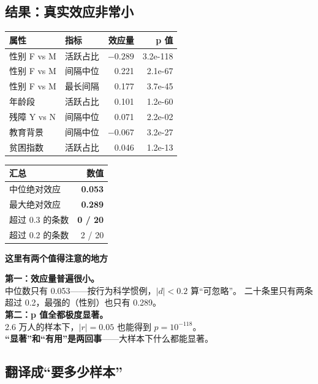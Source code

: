 \documentclass[UTF8,a4paper,11pt]{ctexart}
\newenvironment{explainbox}[1]
{\begin{center}\begin{minipage}{0.94\textwidth}\colorbox{boxbg}{\parbox{0.92\textwidth}{\textbf{#1}\par\vspace{2pt}}}}
{\end{minipage}\end{center}}
\begin{document}
\subsection{结果：真实效应非常小}

\begin{center}
\begin{tabular}{p{4.4cm}p{3.6cm}rr}
\toprule
\textbf{属性} & \textbf{指标} & \textbf{效应量} & \textbf{p 值} \\
\midrule
性别 F vs M & 活跃占比 & \textbf{$-0.289$} & 3.2e-118 \\
性别 F vs M & 间隔中位 & 0.221 & 2.1e-67 \\
性别 F vs M & 最长间隔 & 0.177 & 3.7e-45 \\
年龄段 & 活跃占比 & 0.101 & 1.2e-60 \\
残障 Y vs N & 间隔中位 & 0.071 & 2.2e-02 \\
教育背景 & 间隔中位 & $-0.067$ & 3.2e-27 \\
贫困指数 & 活跃占比 & 0.046 & 1.2e-13 \\
\bottomrule
\end{tabular}
\end{center}

\begin{center}
\begin{tabular}{lr}
\toprule
\textbf{汇总} & \textbf{数值} \\
\midrule
中位绝对效应 & \textbf{0.053} \\
最大绝对效应 & \textbf{0.289} \\
超过 0.3 的条数 & \textbf{0 / 20} \\
超过 0.2 的条数 & 2 / 20 \\
\bottomrule
\end{tabular}
\end{center}

\begin{explainbox}{这里有两个值得注意的地方}
\textbf{第一：效应量普遍很小。}\\
中位数只有 0.053——按行为科学惯例，$\lvert d\rvert < 0.2$ 算“可忽略”。
二十条里只有两条超过 0.2，最强的（性别）也只有 0.289。\\[6pt]
\textbf{第二：p 值全都极度显著。}\\
2.6 万人的样本下，$\lvert r\rvert = 0.05$ 也能得到 $p = 10^{-118}$。\\
\textbf{“显著”和“有用”是两回事}——大样本下什么都能显著。
\end{explainbox}

\subsection{翻译成“要多少样本”}
\end{document}
